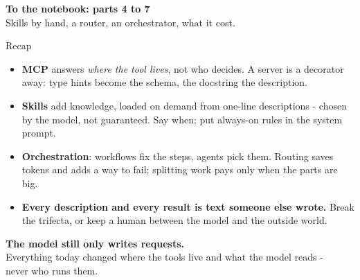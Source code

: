 \documentclass[aspectratio=169]{beamer}
\newcommand{\notebookframe}[2]{%
  \begin{frame}[plain]
    \vfill
    \begin{center}
      {\Large\bfseries\color{paramgreen} To the notebook: #1}\\[1.0em]
      {\large #2}
    \end{center}
    \vfill
  \end{frame}}
\begin{document}
\notebookframe{parts 4 to 7}{Skills by hand, a router, an orchestrator, what it cost.}

\begin{frame}{Recap}
  \vspace{0.4em}
  \small
  \begin{itemize}
    \item \textbf{MCP} answers \emph{where the tool lives}, not who decides. A server is a decorator away: type
      hints become the schema, the docstring the description.
    \item \textbf{Skills} add knowledge, loaded on demand from one-line descriptions - chosen by the model, not
      guaranteed. Say when; put always-on rules in the system prompt.
    \item \textbf{Orchestration}: workflows fix the steps, agents pick them. Routing saves tokens and adds a way
      to fail; splitting work pays only when the parts are big.
    \item \textbf{Every description and every result is text someone else wrote.} Break the trifecta, or keep a
      human between the model and the outside world.
  \end{itemize}
\end{frame}

\begin{frame}[plain]
  \vfill
  \begin{center}
    {\Large\bfseries\color{popblue} The model still only writes requests.}\\[0.8em]
    {\large Everything today changed where the tools live and what the model reads -}\\[0.25em]
    {\large never who runs them.}
  \end{center}
  \vfill
\end{frame}
\end{document}
